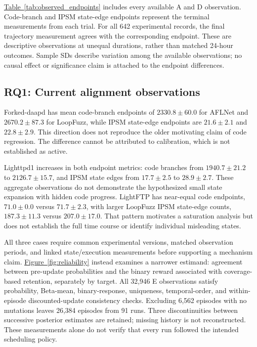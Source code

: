 \documentclass[final,5p,times,number]{elsarticle}
\newcommand{\namedref}[2]{\hyperref[#2]{#1~\ref*{#2}}}
\begin{document}
\namedref{Table}{tab:observed_endpoints} includes every available A and D observation. Code-branch and IPSM state-edge endpoints represent the terminal measurements from each trial. For all 642 experimental records, the final trajectory measurement agrees with the corresponding endpoint. These are descriptive observations at unequal durations, rather than matched 24-hour outcomes. Sample SDs describe variation among the available observations; no causal effect or significance claim is attached to the endpoint differences.

\subsection{RQ1: Current alignment observations}
Forked-daapd has mean code-branch endpoints of $2330.8\pm60.0$ for AFLNet and $2670.2\pm87.3$ for LoopFuzz, while IPSM state-edge endpoints are $21.6\pm2.1$ and $22.8\pm2.9$. This direction does not reproduce the older motivating claim of code regression. The difference cannot be attributed to calibration, which is not established as active.

Lighttpd1 increases in both endpoint metrics: code branches from $1940.7\pm21.2$ to $2126.7\pm15.7$, and IPSM state edges from $17.7\pm2.5$ to $28.9\pm2.7$. These aggregate observations do not demonstrate the hypothesized small state expansion with hidden code progress. LightFTP has near-equal code endpoints, $71.0\pm0.0$ versus $71.7\pm2.3$, with larger LoopFuzz IPSM state-edge counts, $187.3\pm11.3$ versus $207.0\pm17.0$. That pattern motivates a saturation analysis but does not establish the full time course or identify individual misleading states.

All three cases require common experimental versions, matched observation periods, and linked state/execution measurements before supporting a mechanism claim. \namedref{Figure}{fig:reliability} instead examines a narrower estimand: agreement between pre-update probabilities and the binary reward associated with coverage-based retention, separately by target. All 32,946 E observations satisfy probability, Beta-mean, binary-response, uniqueness, temporal-order, and within-episode discounted-update consistency checks. Excluding 6,562 episodes with no mutations leaves 26,384 episodes from 91 runs. Three discontinuities between successive posterior estimates are retained; missing history is not reconstructed. These measurements alone do not verify that every run followed the intended scheduling policy.
\end{document}

